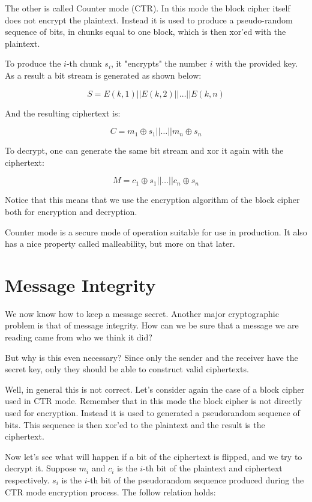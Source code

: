 The other is called Counter mode (CTR).
In this mode the block cipher itself does not encrypt the plaintext.
Instead it is used to produce a pseudo-random sequence of bits, in chunks equal to one block, which is then xor'ed with the plaintext.

To produce the $i$-th chunk $s_i$, it "encrypts" the number $i$ with the provided key.
As a result a bit stream is generated as shown below:

\[
  S = E(k, 1) || E(k, 2) || \dots || E(k, n)
\]

And the resulting ciphertext is:

\[
  C = m_1 \oplus s_1 || \dots || m_n \oplus s_n
\]

To decrypt, one can generate the same bit stream and xor it again with the ciphertext:

\[
  M = c_1 \oplus s_1 || \dots || c_n \oplus s_n
\]

Notice that this means that we use the encryption algorithm of the block cipher both for encryption and decryption.

Counter mode is a secure mode of operation suitable for use in production.
It also has a nice property called malleability, but more on that later.


\section{Message Integrity}

We now know how to keep a message secret.
Another major cryptographic problem is that of message integrity.
How can we be sure that a message we are reading came from who we think it did?

But why is this even necessary?
Since only the sender and the receiver have the secret key, only they should be able to construct valid ciphertexts.

Well, in general this is not correct.
Let's consider again the case of a block cipher used in CTR mode.
Remember that in this mode the block cipher is not directly used for encryption.
Instead it is used to generated a pseudorandom sequence of bits.
This sequence is then xor'ed to the plaintext and the result is the ciphertext.

Now let's see what will happen if a bit of the ciphertext is flipped, and we try to decrypt it.
Suppose $m_i$ and $c_i$ is the $i$-th bit of the plaintext and ciphertext respectively. $s_i$ is the $i$-th bit of the pseudorandom sequence produced during the CTR mode encryption process.
The follow relation holds:

